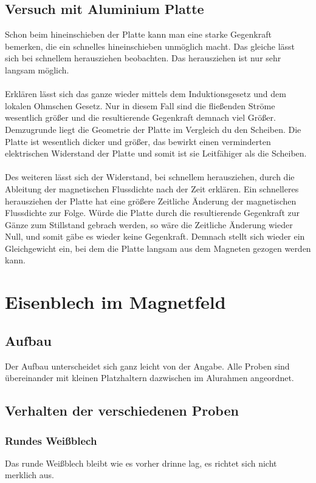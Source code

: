 \documentclass[a4paper,twoside,12pt,DIV=13,BCOR=5mm,numbers=noenddot,cleardoublepage=empty]{scrbook}
\begin{document}
        \subsection{Versuch mit Aluminium Platte}
        Schon beim hineinschieben der Platte kann man eine starke Gegenkraft bemerken, die ein schnelles hineinschieben unm\"oglich macht. Das gleiche l\"asst sich bei schnellem herausziehen beobachten. Das herausziehen ist nur sehr langsam m\"oglich.
        \\
        \\
        Erkl\"aren l\"asst sich das ganze wieder mittels dem Induktionsgesetz und dem lokalen Ohmschen Gesetz. Nur in diesem Fall sind die flie\ss{}enden Str\"ome wesentlich gr\"o\ss{}er und die resultierende Gegenkraft demnach viel Gr\"o\ss{}er. Demzugrunde liegt die Geometrie der Platte im Vergleich du den Scheiben. Die Platte ist wesentlich dicker und gr\"o\ss{}er, das bewirkt einen verminderten elektrischen Widerstand der Platte und somit ist sie Leitf\"ahiger als die Scheiben.
        \\
        \\
        Des weiteren l\"asst sich der Widerstand, bei schnellem herausziehen, durch die Ableitung der magnetischen Flussdichte nach der Zeit erkl\"aren. Ein schnelleres herausziehen der Platte hat eine gr\"o\ss{}ere Zeitliche \"Anderung der magnetischen Flussdichte zur Folge. W\"urde die Platte durch die resultierende Gegenkraft zur G\"anze zum Stillstand gebrach werden, so w\"are die Zeitliche \"Anderung wieder Null, und somit g\"abe es wieder keine Gegenkraft. Demnach stellt sich wieder ein Gleichgewicht ein, bei dem die Platte langsam aus dem Magneten gezogen werden kann. 
    \section{Eisenblech im Magnetfeld}
        \subsection{Aufbau}
        Der Aufbau unterscheidet sich ganz leicht von der Angabe. Alle Proben sind \"ubereinander mit kleinen Platzhaltern dazwischen im Alurahmen angeordnet.
        \subsection{Verhalten der verschiedenen Proben}
            \subsubsection{Rundes Wei\ss{}blech}
            Das runde Wei\ss{}blech bleibt wie es vorher drinne lag, es richtet sich nicht merklich aus.
\end{document}
